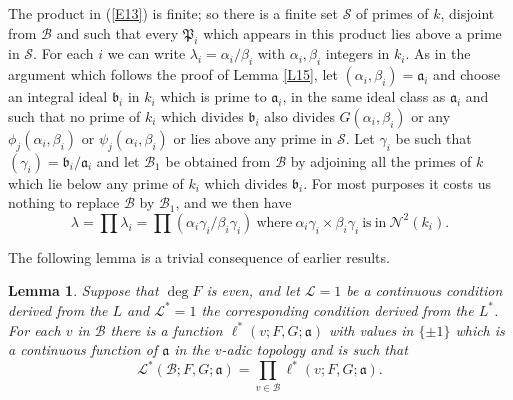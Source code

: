 \documentclass[12pt]{article}
\def\fa{{\mathfrak a}}
\def\fb{{\mathfrak b}}
\def\fP{{\mathfrak P}}
\def\ga{{\alpha}}
\def\gb{{\beta}}
\def\gg{{\gamma}}
\def\gl{{\lambda}}
\def\sB{{\mathcal B}}
\def\sL{{\mathcal L}}
\def\sN{{\mathcal N}}
\def\sS{{\mathcal S}}
\def\beq{\begin{equation} \label}
\def\ble{\begin{lemma} \label}
\def\ele{\end{lemma}}
\newtheorem{lemma}{Lemma}
\begin{document}
The product in (\ref{E13}) is finite; so there is a finite set $\sS$ of
primes of $k$, disjoint from $\sB$ and such that every $\fP_i$ which appears
in this product lies above a prime in $\sS$. For each $i$ we can write
$\gl_i=\ga_i/\gb_i$ with $\ga_i,\gb_i$ integers in $k_i$. As in the
argument which follows the proof of Lemma \ref{L15},
let $(\ga_i,\gb_i)=\fa_i$ and choose an
integral ideal $\fb_i$ in $k_i$ which is prime to $\fa_i$, in the same ideal
class as $\fa_i$ and such that no prime of $k_i$ which divides $\fb_i$ also
divides $G(\ga_i,\gb_i)$ or any $\phi_j(\ga_i,\gb_i)$ or $\psi_j(\ga_i,\gb_i)$
or lies above any prime in $\sS$. Let $\gg_i$ be such that $(\gg_i)=\fb_i/\fa_i$
and let $\sB_1$ be obtained from $\sB$ by adjoining all the primes of $k$
which lie below any prime of $k_i$ which divides $\fb_i$. For most purposes
it costs us nothing to replace $\sB$ by $\sB_1$, and we then have
\[ \gl=\prod\gl_i=\prod(\ga_i\gg_i/\gb_i\gg_i) {\mathrm{~where~}}
\ga_i\gg_i\times\gb_i\gg_i {\mathrm{~is~in~}} \sN^2(k_i). \]

The following lemma is a trivial consequence of earlier results.
\ble{L4} Suppose that $\deg F$ is even, and let $\sL=1$ be a continuous
condition derived from the $L$ and $\sL^*=1$ the corresponding condition derived
from the $L^*$.
For each $v$ in $\sB$ there is a function $\ell^*(v;F,G;\fa)$ with
values in $\{\pm1\}$ which is a continuous function of $\fa$ in the $v$-adic
topology and is such that
\beq{E23} \sL^*(\sB;F,G;\fa)=\prod_{v\in\sB}\ell^*(v;F,G;\fa). \end{equation}
\ele

\newpage
\end{document}

